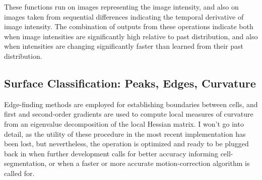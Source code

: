 \documentclass[../main.tex]{subfiles}
\begin{document}


These functions run on images representing the image intensity, and also on images taken from sequential differences indicating the temporal derivative of image intensity.
The combination of outputs from these operations indicate both when image intensities are significantly high relative to past distribution, and also when intensities are changing significantly faster than learned from their past distribution.

\subsection{Surface Classification: Peaks, Edges, Curvature}\label{sec:surface-classification-peaks-edges-curvature}

Edge-finding methods are employed for establishing boundaries between cells, and first and second-order gradients are used to compute local measures of curvature from an eigenvalue decomposition of the local Hessian matrix.
I won't go into detail, as the utility of these procedure in the most recent implementation has been lost, but nevertheless, the operation is optimized and ready to be plugged back in when further development calls for better accuracy informing cell-segmentation, or when a faster or more accurate motion-correction algorithm is called for.
\end{document}
